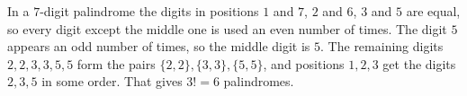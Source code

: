 In a $7$-digit palindrome the digits in positions $1$ and $7$, $2$ and $6$, $3$ and $5$ are equal, so every digit except the middle one is used an even number of times. The digit $5$ appears an odd number of times, so the middle digit is $5$. The remaining digits $2,2,3,3,5,5$ form the pairs $\{2,2\},\{3,3\},\{5,5\}$, and positions $1,2,3$ get the digits $2,3,5$ in some order. That gives $3!=\boxed{6}$ palindromes.
